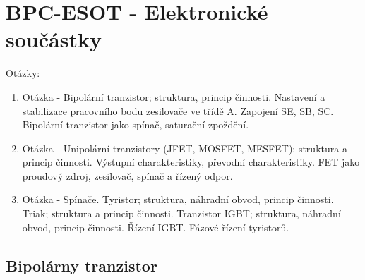 \part{BPC-ESOT - Elektronické součástky}

\begin{huge}
	Otázky:
	\newline
\end{huge}
\begin{enumerate}
	\item Otázka - Bipolární tranzistor; struktura, princip činnosti. Nastavení a stabilizace pracovního bodu zesilovače ve třídě A. Zapojení SE, SB, SC. Bipolární tranzistor jako spínač, saturační zpoždění.
	\item Otázka - Unipolární tranzistory (JFET, MOSFET, MESFET); struktura a princip činnosti. Výstupní charakteristiky, převodní charakteristiky. FET jako proudový zdroj, zesilovač, spínač a řízený odpor.
	\item Otázka - Spínače. Tyristor; struktura, náhradní obvod, princip činnosti. Triak; struktura a princip činnosti. Tranzistor IGBT; struktura, náhradní obvod, princip činnosti. Řízení IGBT. Fázové řízení tyristorů. 
\end{enumerate}
\chapter{Bipolárny tranzistor}

